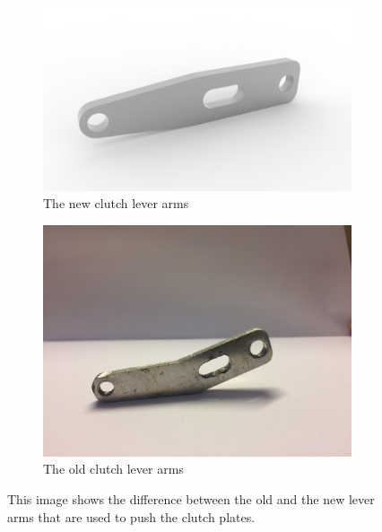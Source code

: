 \begin{figure}[H]
    \centering
    \begin{subfigure}[H]{0.55\textwidth}
    \includegraphics[width=\textwidth]{./img/clutch}
    \caption{The new clutch lever arms}\label{fig:clutch}
    \end{subfigure}
    \begin{subfigure}[H]{0.44\textwidth}
    \includegraphics[width=\textwidth]{./img/Clutch_old}
    \caption{The old clutch lever arms}\label{fig:old_clutch}
    \end{subfigure}
    \caption{This image shows the difference between the old and the new lever arms that are used to push the clutch plates.}
\end{figure}

